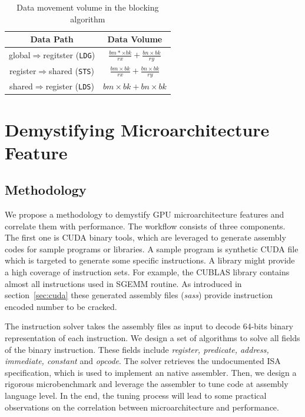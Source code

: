 \documentclass{sig-alternate-05-2015}
\begin{document}
\begin{table}[!t]
\caption{Data movement volume in the blocking algorithm}
\centering
\scalebox{1.0} {
\begin{tabular}{|c||c|}
\hline
Data Path& Data Volume\\
\hline
global$\Rightarrow$regitster ({\tt LDG})& $\frac{bm*\times bk}{rx} + \frac{bn\times bk}{ry}$\\
\hline
register$\Rightarrow$shared ({\tt STS})& $\frac{bm\times bk}{rx} + \frac{bn\times bk}{ry}$\\
\hline
shared$\Rightarrow$register ({\tt LDS})& $bm\times bk + bn\times bk$\\
\hline
\end{tabular}
}
\label{tab:reg}
\end{table}

\section{Demystifying Microarchitecture Feature}
\label{sec:assembler}

\subsection{Methodology}
We propose a methodology to demystify GPU microarchitecture features and correlate them with performance. The workflow consists of three components.  The first one is CUDA binary tools, which are leveraged to generate assembly codes for sample programs or libraries. A sample program is synthetic CUDA file which is targeted to generate some specific instructions. A library might provide a high coverage of instruction sets. For example, the CUBLAS library contains almost all instructions used in SGEMM routine. As introduced in section~\ref{sec:cuda} these generated assembly files ({\em sass}) provide instruction encoded number to be cracked.

The instruction solver takes the assembly files as input to decode 64-bits binary representation of each instruction. We design a set of algorithms to solve all fields of the binary instruction. These fields include {\em register, predicate, address, immediate, constant} and {\em opcode}. The solver retrieves the undocumented ISA specification, which is used to implement an native assembler. Then, we design a rigorous microbenchmark and leverage the assembler to tune code at assembly language level. In the end, the tuning process will lead to some practical observations on the correlation between microarchitecture and performance.
\end{document}
